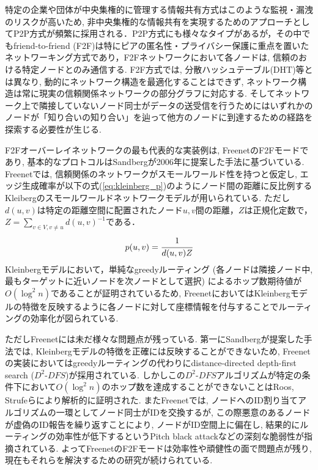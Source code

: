 \documentclass[technicalreport]{./ieicej-v3.0/UTF/ieicej}
\begin{document}
特定の企業や団体が中央集権的に管理する情報共有方式はこのような監視・漏洩のリスクが高いため, 非中央集権的な情報共有を実現するためのアプローチとしてP2P方式が頻繁に採用される．P2P方式にも様々なタイプがあるが，その中でもfriend-to-friend (F2F)\cite{bricklin2000friend}は特にピアの匿名性・プライバシー保護に重点を置いたネットワーキング方式であり，F2Fネットワークにおいて各ノードは, 信頼のおける特定ノードとのみ通信する. F2F方式では, 分散ハッシュテーブル(DHT)等とは異なり, 動的にネットワーク構造を最適化することはできず, ネットワーク構造は常に現実の信頼関係ネットワークの部分グラフに対応する. そしてネットワーク上で隣接していないノード同士がデータの送受信を行うためにはいずれかのノードが「知り合いの知り合い」を辿って他方のノードに到達するための経路を探索する必要性が生じる\cite{rogers2007disappear,roos2016analyzing}.

F2Fオーバーレイネットワークの最も代表的な実装例は, Freenet\cite{clarke2001freenet}のF2Fモード\cite{clarke2010private}であり, 基本的なプロトコルはSandbergが2006年に提案した手法\cite{sandberg2006distributed}に基づいている. Freenetでは, 信頼関係のネットワークがスモールワールド性を持つと仮定し, エッジ生成確率が以下の式(\ref{eq:kleinberg_p})のようにノード間の距離に反比例するKleibergのスモールワールドネットワークモデル\cite{kleinberg2000small}が用いられている. ただし$d(u,v)$は特定の距離空間に配置されたノード$u,v$間の距離，$Z$は正規化定数で，$Z = \displaystyle \sum_{v\in V, v\neq u}^{}d(u,v)^{-1}$である．
\begin{eqnarray}
 p(u,v)=\cfrac{1}{d(u,v)Z} \label{eq:kleinberg_p}
\end{eqnarray}
Kleinbergモデルにおいて，単純なgreedyルーティング (各ノードは隣接ノード中, 最もターゲットに近いノードを次ノードとして選択) によるホップ数期待値が$O(\log^2 n)$であることが証明されているため, FreenetにおいてはKleinbergモデルの特徴を反映するように各ノードに対して座標情報を付与することでルーティングの効率化が図られている. 

ただしFreenetには未だ様々な問題点が残っている. 第一にSandbergが提案した手法では, Kleinbergモデルの特徴を正確には反映することができないため, Freenetの実装においてはgreedyルーティングの代わりにdistance-directed depth-first search ($D^2$-$DFS$)が採用されている. しかしこの$D^2$-$DFS$アルゴリズムが特定の条件下において$O(\log^2 n)$のホップ数を達成することができないことはRoos, Strufeらにより解析的に証明された\cite{roos2016dealing}. またFreenetでは, ノードへのID割り当てアルゴリズムの一環としてノード同士がIDを交換するが, この際悪意のあるノードが虚偽のID報告を繰り返すことにより, ノードがID空間上に偏在し, 結果的にルーティングの効率性が低下するというPitch black attack\cite{evans2007routing}などの深刻な脆弱性が指摘されている. よってFreenetのF2Fモードは効率性や頑健性の面で問題点が残り, 現在もそれらを解決するための研究が続けられている.
\end{document}

